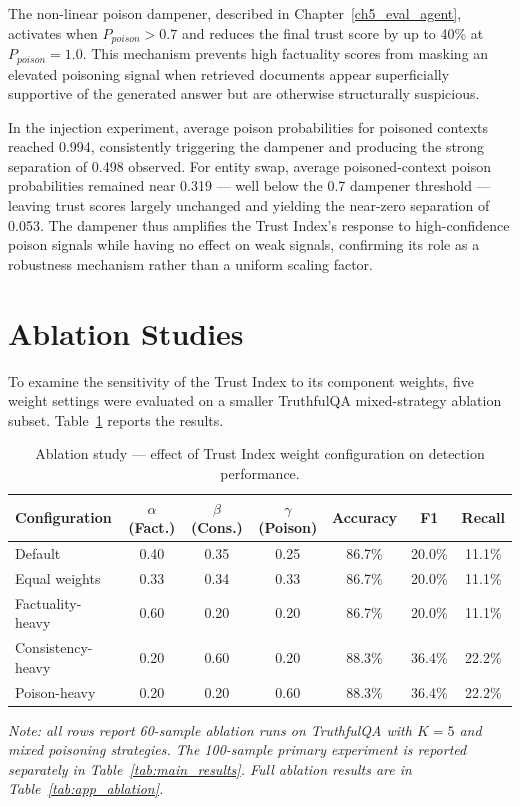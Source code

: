 The non-linear poison dampener, described in Chapter~\ref{ch5_eval_agent}, activates when
$P_{poison} > 0.7$ and reduces the final trust score by up to 40\% at $P_{poison} = 1.0$.
This mechanism prevents high factuality scores from masking an elevated poisoning signal
when retrieved documents appear superficially supportive of the generated answer but are
otherwise structurally suspicious.

In the injection experiment, average poison probabilities for poisoned contexts reached
0.994, consistently triggering the dampener and producing the strong separation of 0.498
observed. For entity swap, average poisoned-context poison probabilities remained near
0.319 --- well below the 0.7 dampener threshold --- leaving trust scores largely unchanged
and yielding the near-zero separation of 0.053. The dampener thus amplifies the Trust
Index's response to high-confidence poison signals while having no effect on weak signals,
confirming its role as a robustness mechanism rather than a uniform scaling factor.

\section{Ablation Studies}
\label{sec:ch6_ablation}

To examine the sensitivity of the Trust Index to its component weights, five weight
settings were evaluated on a smaller TruthfulQA mixed-strategy ablation subset.
Table~\ref{tab:ablation} reports the results.

\begin{table}[h]
\centering
\caption{Ablation study --- effect of Trust Index weight configuration on detection performance.}
\label{tab:ablation}
\begin{tabular}{lcccccc}
\hline
\textbf{Configuration} & \textbf{$\alpha$ (Fact.)} & \textbf{$\beta$ (Cons.)}
    & \textbf{$\gamma$ (Poison)} & \textbf{Accuracy} & \textbf{F1} & \textbf{Recall} \\
\hline
Default          & 0.40 & 0.35 & 0.25 & 86.7\% & 20.0\% & 11.1\% \\
Equal weights    & 0.33 & 0.34 & 0.33 & 86.7\% & 20.0\% & 11.1\% \\
Factuality-heavy & 0.60 & 0.20 & 0.20 & 86.7\% & 20.0\% & 11.1\% \\
Consistency-heavy & 0.20 & 0.60 & 0.20 & 88.3\% & 36.4\% & 22.2\% \\
Poison-heavy     & 0.20 & 0.20 & 0.60 & 88.3\% & 36.4\% & 22.2\% \\
\hline
\end{tabular}
\end{table}
\small\textit{Note: all rows report 60-sample ablation runs on TruthfulQA with $K=5$
and mixed poisoning strategies. The 100-sample primary experiment is reported separately
in Table~\ref{tab:main_results}. Full ablation results are in Table~\ref{tab:app_ablation}.}


